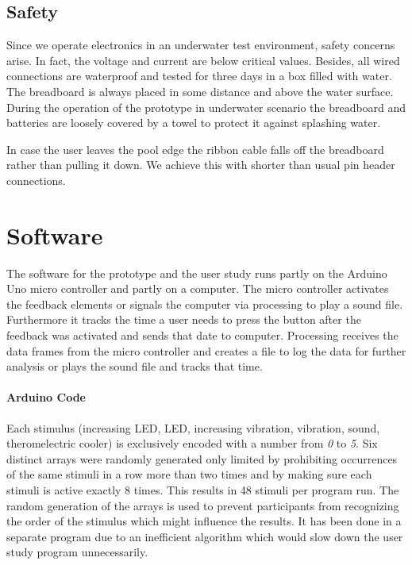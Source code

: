 \subsection{Safety}

Since we operate electronics in an underwater test environment, safety concerns arise.
In fact, the voltage and current are below critical values.
Besides, all  wired connections are waterproof and tested for three days in a box filled with water.
The breadboard is always placed in some distance and above the water surface.
During the operation of the prototype in underwater scenario the breadboard and batteries are loosely covered by a towel to protect it against splashing water.

In case the user leaves the pool edge the ribbon cable falls off the breadboard rather than pulling it down. 
We achieve this with shorter than usual pin header connections.

\section{Software}

The  software for the prototype and the user study runs partly on the Arduino Uno micro controller and partly on a computer.
The micro controller activates the feedback elements or signals the computer via processing to play a sound file. 
Furthermore it tracks the time a user needs to press the button after the feedback was activated and sends that date to computer.
Processing receives the data frames from the micro controller and creates a file to log the data for further analysis or plays the sound file and tracks that time.

\paragraph{Arduino Code}
Each stimulus (increasing LED, LED, increasing vibration, vibration, sound, theromelectric cooler) is exclusively encoded with a number from \emph{0} to \emph{5}.
Six distinct arrays were randomly generated only limited by prohibiting occurrences of the same stimuli in a row more than two times and by making sure each stimuli is active exactly 8 times.
This results in 48 stimuli per program run.
The random generation of the arrays is used to prevent participants from recognizing the order of the stimulus which might influence the results.
It has been done in a  separate program due to an inefficient algorithm which would slow down the user study program unnecessarily.

